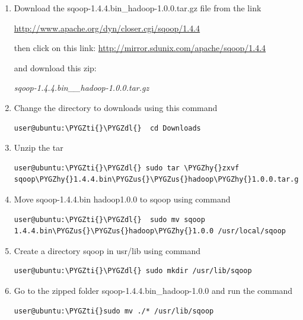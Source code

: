 \documentclass[a4paper,12pt,oneside]{sphinxmanual}
\def\PYGZus{\char`\_}
\def\PYGZdl{\char`\$}
\def\PYGZhy{\char`\-}
\def\PYGZti{\char`\~}
\begin{document}
\begin{enumerate}
\item {} 
Download the sqoop-1.4.4.bin\_hadoop-1.0.0.tar.gz  file from the link

\href{http://www.apache.org/dyn/closer.cgi/sqoop/1.4.4}{http://www.apache.org/dyn/closer.cgi/sqoop/1.4.4}

then click on this link:
\href{http://mirror.sdunix.com/apache/sqoop/1.4.4}{http://mirror.sdunix.com/apache/sqoop/1.4.4}

and download this zip:

\emph{sqoop-1.4.4.bin\_\_hadoop-1.0.0.tar.gz}

\item {} 
Change the directory to downloads using this command

\begin{Verbatim}[commandchars=\\\{\}]
user@ubuntu:\PYGZti{}\PYGZdl{}  cd Downloads
\end{Verbatim}

\item {} 
Unzip the tar

\begin{Verbatim}[commandchars=\\\{\}]
user@ubuntu:\PYGZti{}\PYGZdl{} sudo tar \PYGZhy{}zxvf sqoop\PYGZhy{}1.4.4.bin\PYGZus{}\PYGZus{}hadoop\PYGZhy{}1.0.0.tar.gz
\end{Verbatim}

\item {} 
Move sqoop-1.4.4.bin hadoop1.0.0 to sqoop using command

\begin{Verbatim}[commandchars=\\\{\}]
user@ubuntu:\PYGZti{}\PYGZdl{}  sudo mv sqoop 1.4.4.bin\PYGZus{}\PYGZus{}hadoop\PYGZhy{}1.0.0 /usr/local/sqoop
\end{Verbatim}

\item {} 
Create a directory sqoop in usr/lib using command

\begin{Verbatim}[commandchars=\\\{\}]
user@ubuntu:\PYGZti{}\PYGZdl{} sudo mkdir /usr/lib/sqoop
\end{Verbatim}

\item {} 
Go to the zipped folder sqoop-1.4.4.bin\_hadoop-1.0.0 and run the command

\begin{Verbatim}[commandchars=\\\{\}]
user@ubuntu:\PYGZti{}sudo mv ./* /usr/lib/sqoop
\end{Verbatim}


\end{enumerate}
\end{document}
